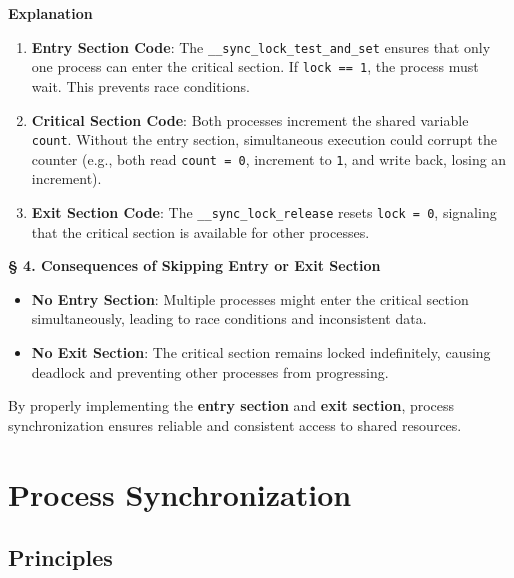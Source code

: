 \documentclass[a4paper]{book}
\newcommand{\sfbf}[1]{{\normalsize\textsf{\textbf{§ #1}}}}
\begin{document}
\hrulefill

\textbf{Explanation}

\begin{enumerate}
\item 
\textbf{Entry Section Code}: The \verb|__sync_lock_test_and_set| ensures that only one process can enter the critical section. If \verb|lock == 1|, the process must wait. This prevents race conditions.

\item 
\textbf{Critical Section Code}: Both processes increment the shared variable \verb|count|. Without the entry section, simultaneous execution could corrupt the counter (e.g., both read \verb|count = 0|, increment to \verb|1|, and write back, losing an increment).

\item 
\textbf{Exit Section Code}: The \verb|__sync_lock_release| resets \verb|lock = 0|, signaling that the critical section is available for other processes.

\end{enumerate}

\hrulefill

\sfbf{4. Consequences of Skipping Entry or Exit Section}

\begin{itemize}
\item 
\textbf{No Entry Section}: Multiple processes might enter the critical section simultaneously, leading to race conditions and inconsistent data.

\item 
\textbf{No Exit Section}: The critical section remains locked indefinitely, causing deadlock and preventing other processes from progressing.

\end{itemize}

\hrulefill

By properly implementing the \textbf{entry section} and \textbf{exit section}, process synchronization ensures reliable and consistent access to shared resources.

\section{Process Synchronization}

\subsection{Principles}
\end{document}
